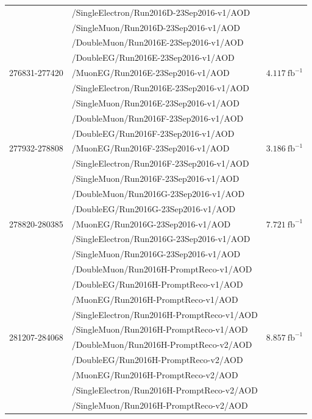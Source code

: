 \begin{table}[h]
\begin{tabular}{|l|l|l|}
& /SingleElectron/Run2016D-23Sep2016-v1/AOD &  \\ 
& /SingleMuon/Run2016D-23Sep2016-v1/AOD &  \\ 
\hline
\multirow{5}{*}{276831-277420} & /DoubleMuon/Run2016E-23Sep2016-v1/AOD &  \multirow{5}{*}{$4.117\ \text{fb}^{-1}$} \\ 
& /DoubleEG/Run2016E-23Sep2016-v1/AOD &  \\ 
& /MuonEG/Run2016E-23Sep2016-v1/AOD &  \\ 
& /SingleElectron/Run2016E-23Sep2016-v1/AOD &  \\ 
& /SingleMuon/Run2016E-23Sep2016-v1/AOD &  \\ 
\hline
\multirow{5}{*}{277932-278808} & /DoubleMuon/Run2016F-23Sep2016-v1/AOD &  \multirow{5}{*}{$3.186\ \text{fb}^{-1}$} \\ 
& /DoubleEG/Run2016F-23Sep2016-v1/AOD &  \\ 
& /MuonEG/Run2016F-23Sep2016-v1/AOD &  \\ 
& /SingleElectron/Run2016F-23Sep2016-v1/AOD &  \\ 
& /SingleMuon/Run2016F-23Sep2016-v1/AOD &  \\ 
\hline
\multirow{5}{*}{278820-280385} & /DoubleMuon/Run2016G-23Sep2016-v1/AOD &  \multirow{5}{*}{$7.721\ \text{fb}^{-1}$} \\ 
& /DoubleEG/Run2016G-23Sep2016-v1/AOD &  \\ 
& /MuonEG/Run2016G-23Sep2016-v1/AOD &  \\ 
& /SingleElectron/Run2016G-23Sep2016-v1/AOD &  \\ 
& /SingleMuon/Run2016G-23Sep2016-v1/AOD &  \\ 
\hline
\multirow{15}{*}{281207-284068} & /DoubleMuon/Run2016H-PromptReco-v1/AOD &  \multirow{15}{*}{$8.857\ \text{fb}^{-1}$} \\ 
& /DoubleEG/Run2016H-PromptReco-v1/AOD &  \\ 
& /MuonEG/Run2016H-PromptReco-v1/AOD &  \\ 
& /SingleElectron/Run2016H-PromptReco-v1/AOD &  \\ 
& /SingleMuon/Run2016H-PromptReco-v1/AOD &  \\ 
& /DoubleMuon/Run2016H-PromptReco-v2/AOD &  \\ 
& /DoubleEG/Run2016H-PromptReco-v2/AOD &  \\ 
& /MuonEG/Run2016H-PromptReco-v2/AOD &  \\ 
& /SingleElectron/Run2016H-PromptReco-v2/AOD &  \\ 
& /SingleMuon/Run2016H-PromptReco-v2/AOD &  \\ 

\end{tabular}
\end{table}

